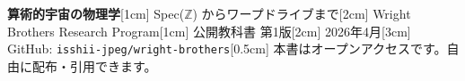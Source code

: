 \documentclass[11pt,a4paper]{article}
\def\\{}%
\begin{document}
\begin{titlepage}
\centering
\vspace*{3cm}
{\Huge\bfseries 算術的宇宙の物理学}\\[1cm]
{\LARGE Spec($\mathbb{Z}$) からワープドライブまで}\\[2cm]
{\Large Wright Brothers Research Program}\\[1cm]
{\large 公開教科書 第1版}\\[2cm]
{\large 2026年4月}\\[3cm]
{\normalsize GitHub: \texttt{isshii-jpeg/wright-brothers}}\\[0.5cm]
{\small 本書はオープンアクセスです。自由に配布・引用できます。}
\end{titlepage}

\tableofcontents
\newpage












\end{document}
